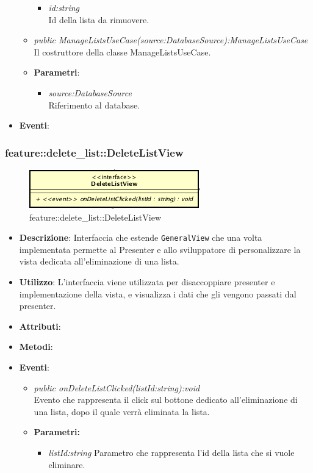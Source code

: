 \begin{itemize}
\begin{itemize}
{\begin{itemize}
			\item \textit{id:string}\\
			Id della lista da rimuovere.
			\end{itemize}}
	\item \textit{public ManageListsUseCase(source:DatabaseSource):ManageListsUseCase}\\
	Il costruttore della classe ManageListsUseCase.
		\item{\textbf{Parametri}: \begin{itemize}
			\item \textit{source:DatabaseSource}\\
						Riferimento al database.
			\end{itemize}}
	\end{itemize}
\item \textbf{Eventi}:
\end{itemize}

\subsubsection{feature::delete\_list::DeleteListView}

\label{feature::delete_list::DeleteListView}
\begin{figure}[ht]
	\centering
	\includegraphics[scale=0.5]{Sezioni/SottosezioniST/img/app/DeleteListView.png}
	\caption{feature::delete\_list::DeleteListView}
\end{figure}

\begin{itemize}
\item \textbf{Descrizione}: Interfaccia che estende \texttt{GeneralView} che una volta implementata permette al Presenter e allo sviluppatore di personalizzare la vista dedicata all'eliminazione di una lista.
\item \textbf{Utilizzo}: L'interfaccia viene utilizzata per disaccoppiare presenter e implementazione della vista, e visualizza i dati che gli vengono passati dal presenter.
\item \textbf{Attributi}: 
\item \textbf{Metodi}:
\item \textbf{Eventi}:
	\begin{itemize}
	\item \textit{public onDeleteListClicked(listId:string):void}\\
	Evento che rappresenta il click sul bottone dedicato all'eliminazione di una lista, dopo il quale verrà eliminata la lista.
	\item{\textbf{Parametri:} \begin{itemize}
	\item \textit{listId:string}
	Parametro che rappresenta l'id della lista che si vuole eliminare.
	\end{itemize}}
	\end{itemize}
\end{itemize}

